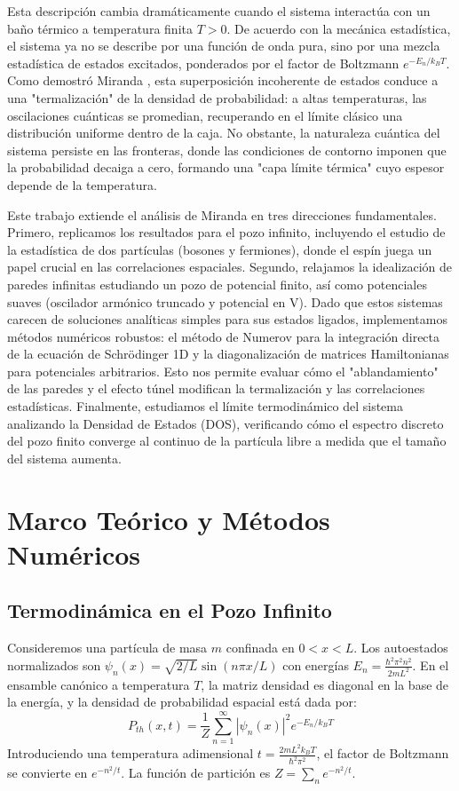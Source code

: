 \documentclass[twocolumn,superscriptaddress,prl,10pt]{revtex4-2}
\begin{document}
Esta descripción cambia dramáticamente cuando el sistema interactúa con un baño térmico a temperatura finita $T > 0$. De acuerdo con la mecánica estadística, el sistema ya no se describe por una función de onda pura, sino por una mezcla estadística de estados excitados, ponderados por el factor de Boltzmann $e^{-E_n/k_B T}$. Como demostró Miranda \cite{Miranda2019}, esta superposición incoherente de estados conduce a una "termalización" de la densidad de probabilidad: a altas temperaturas, las oscilaciones cuánticas se promedian, recuperando en el límite clásico una distribución uniforme dentro de la caja. No obstante, la naturaleza cuántica del sistema persiste en las fronteras, donde las condiciones de contorno imponen que la probabilidad decaiga a cero, formando una "capa límite térmica" cuyo espesor depende de la temperatura.

Este trabajo extiende el análisis de Miranda en tres direcciones fundamentales. Primero, replicamos los resultados para el pozo infinito, incluyendo el estudio de la estadística de dos partículas (bosones y fermiones), donde el espín juega un papel crucial en las correlaciones espaciales. Segundo, relajamos la idealización de paredes infinitas estudiando un pozo de potencial finito, así como potenciales suaves (oscilador armónico truncado y potencial en V). Dado que estos sistemas carecen de soluciones analíticas simples para sus estados ligados, implementamos métodos numéricos robustos: el método de Numerov para la integración directa de la ecuación de Schrödinger 1D y la diagonalización de matrices Hamiltonianas para potenciales arbitrarios. Esto nos permite evaluar cómo el "ablandamiento" de las paredes y el efecto túnel modifican la termalización y las correlaciones estadísticas. Finalmente, estudiamos el límite termodinámico del sistema analizando la Densidad de Estados (DOS), verificando cómo el espectro discreto del pozo finito converge al continuo de la partícula libre a medida que el tamaño del sistema aumenta.

\section{Marco Teórico y Métodos Numéricos}

\subsection{Termodinámica en el Pozo Infinito}
Consideremos una partícula de masa $m$ confinada en $0 < x < L$. Los autoestados normalizados son $\psi_n(x) = \sqrt{2/L} \sin(n\pi x/L)$ con energías $E_n = \frac{\hbar^2 \pi^2 n^2}{2mL^2}$. En el ensamble canónico a temperatura $T$, la matriz densidad es diagonal en la base de la energía, y la densidad de probabilidad espacial está dada por:
\begin{equation}
P_{th}(x, t) = \frac{1}{Z} \sum_{n=1}^{\infty} |\psi_n(x)|^2 e^{-E_n/k_B T}
\end{equation}
Introduciendo una temperatura adimensional $t = \frac{2mL^2 k_B T}{\hbar^2 \pi^2}$, el factor de Boltzmann se convierte en $e^{-n^2/t}$. La función de partición es $Z = \sum_n e^{-n^2/t}$.
\end{document}
